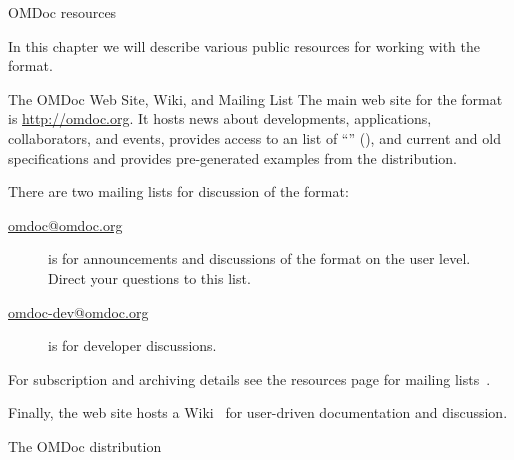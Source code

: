 
\begin{tchapter}[id=resources]{OMDoc resources}

In this chapter we will describe various public resources for working with the
{\omdoc} format.

\begin{tsection}[id=website]{The OMDoc Web Site, Wiki, and Mailing List}
  The main web site for the {\omdoc} format is \url{http://omdoc.org}.  It
  hosts news about developments, applications, collaborators, and events, provides access
  to an list of ``'' ({}), and
  current and old {\omdoc} specifications and provides pre-generated examples from the
  {\omdoc} distribution.
  
  There are two mailing lists for discussion of the {\omdoc} format: 
  \begin{description}
  \item[\url{omdoc@omdoc.org}] is for announcements and discussions of the {\omdoc}
    format on the user level. Direct your questions to this list.
  \item[\url{omdoc-dev@omdoc.org}] is for developer discussions.
  \end{description}
  For subscription and archiving details see the {\omdoc} resources page for mailing
  lists~\cite{OMDoc-mailinglists:URL}.
  
  Finally, the {\omdoc} web site hosts a Wiki~\cite{OMDoc:wiki} for user-driven
  documentation and discussion.
\end{tsection}

\begin{tsection}[id=distribution]{The OMDoc distribution}
  

\end{tsection}
\end{tchapter}
